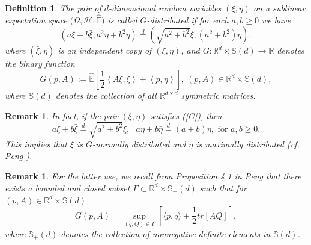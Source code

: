 \documentclass[a4paper,oneside,10pt]{article}%
\newtheorem{definition}[theorem]{Definition}
\newtheorem{proposition}[theorem]{Proposition}
\newtheorem{remark}[theorem]{Remark}
\numberwithin{equation}{section}
\begin{document}
\begin{definition}
The pair of $d$-dimensional random variables $(\xi,\eta)$ on a sublinear
expectation space $(\Omega,\mathcal{H},\mathbb{\hat{E})}$ is called
$G$-distributed if for each $a,b\geq0$ we have
\begin{equation}
\left(  a\xi+b\bar{\xi},a^{2}\eta+b^{2}\bar{\eta}\right)  \overset{d}%
{=}\left(  \sqrt{a^{2}+b^{2}}\xi,(a^{2}+b^{2})\eta \right)  ,\label{G}%
\end{equation}
where $(\bar{\xi},\bar{\eta})$ is an independent copy of $(\xi,\eta)$, and
$G:\mathbb{R}^{d}\times \mathbb{S}(d)\rightarrow \mathbb{R}$ denotes the binary
function
\begin{equation}
G\left(  p,A\right)  :=\mathbb{\hat{E}}\left[  \frac{1}{2}\left \langle
A\xi,\xi \right \rangle +\left \langle p,\eta \right \rangle \right]
,\ (p,A)\in \mathbb{R}^{d}\times \mathbb{S}(d), \label{G(p,A)}%
\end{equation}
where $\mathbb{S}(d)$ denotes the collection of all $\mathbb{R}^{d\times d}$
symmetric matrices.
\end{definition}

\begin{remark}
In fact, if the pair $(\xi,\eta)$ satisfies (\ref{G}), then
\[
a\xi+b\bar{\xi}\overset{d}{=}\sqrt{a^{2}+b^{2}}\xi,\text{ \ }a\eta+b\bar{\eta
}\overset{d}{=}(a+b)\eta, \text{ \ for }a,b\geq0.
\]
This implies that $\xi$ is $G$-normally distributed and $\eta$ is maximally
distributed (cf. Peng \cite{P2010}).
\end{remark}

\begin{remark}
\label{remark_G} For the latter use, we recall from Proposition 4.1 in Peng
\cite{P20082} that there exists a bounded and closed subset $\Gamma
\subset \mathbb{R}^{d}\times \mathbb{S}_{+}(d)$ such that for $(p,A)\in
\mathbb{R}^{d}\times \mathbb{S}(d)$,
\[
G(p,A)=\sup_{(q,Q)\in \Gamma}\left[  \langle p,q\rangle+\frac{1}{2}%
tr[AQ]\right]  ,
\]
where $\mathbb{S}_{+}(d)$ denotes the collection of nonnegative definite
elements in $\mathbb{S}(d)$.
\end{remark}

\end{document}
